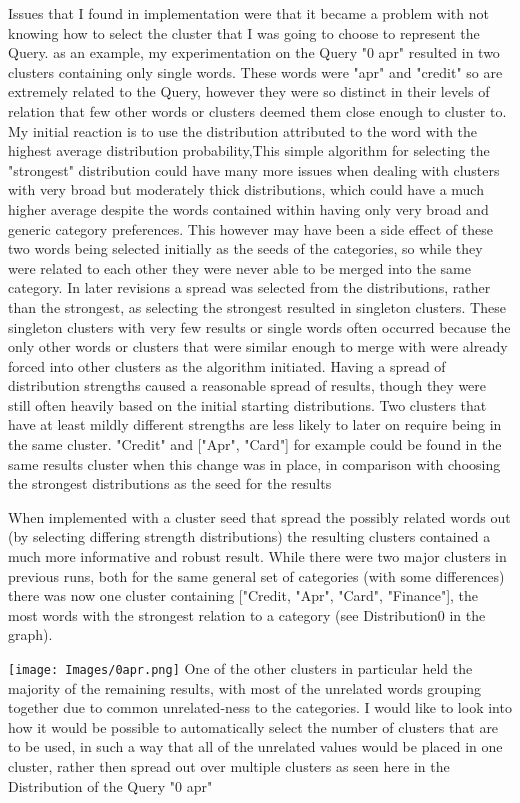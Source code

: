 \documentclass[letterpaper]{article}
\begin{document}
Issues that I found in implementation were that it became a problem with not knowing how to select the cluster that I was going to choose to represent the Query.
as an example, my experimentation on the Query "0 apr" resulted in two clusters containing only single words. These words were "apr" and "credit" so are extremely related
to the Query, however they were so distinct in their levels of relation that few other words or clusters deemed them close enough to cluster to. My initial reaction
is to use the distribution attributed to the word with the highest average distribution probability,This simple algorithm for selecting the "strongest" distribution could have many more issues when dealing with clusters with very broad but moderately thick distributions, which could have a much higher average despite the words contained within having only very broad and generic category preferences.  
This however may have been a side effect of these two words being selected initially as the seeds of the categories, so while they were related to each other they were never able to be merged into the same category. In later revisions a spread was selected from the distributions, rather than the strongest, as selecting the strongest resulted in singleton clusters. These singleton clusters with very few results or single words often occurred because the only other words or clusters that were similar enough to merge with were already forced into other clusters as the algorithm initiated. Having a spread of distribution strengths caused a reasonable spread of results, though they were still often heavily based on the initial starting distributions.  Two clusters that have at least mildly different strengths are less likely to later on require being in the same cluster. "Credit" and ["Apr", "Card"] for example could be found in the same results cluster when this change was in place, in comparison with choosing the strongest distributions as the seed for the results

When implemented with a cluster seed that spread the possibly related words out (by selecting differing strength distributions) the resulting clusters contained a much more informative and robust result.
While there were two major clusters in previous runs, both for the same general set of categories (with some differences) there was now one cluster containing ["Credit, "Apr", "Card", "Finance"], the most words with the strongest relation to a category (see Distribution0 in the graph). 

	\texttt{[image: Images/0apr.png]}
 One of the other clusters in particular held the majority of the remaining results, with most of the unrelated words grouping together due to common unrelated-ness to the categories. I would like to look into how it would be possible to automatically select the number of clusters that are to be used, in such a way that all of the unrelated values would be placed in one cluster, rather then spread out over multiple clusters as seen here in the Distribution of the Query "0 apr"
\end{document}
